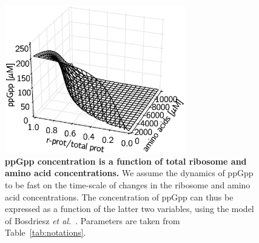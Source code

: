 \documentclass[a4paper,12pt]{article}
\begin{document}



\pagebreak
\begin{figure}[!ht]
\centering
\includegraphics[width=0.7\textwidth]{./Fig/FigS4-1.eps}
\caption[ppGpp concentration is a function of total ribosome and amino acid concentrations.]
{
{\bf ppGpp concentration is a function of total ribosome and amino acid concentrations.}\newline
We assume the dynamics of ppGpp to be fast on the time-scale of changes in the ribosome and amino acid concentrations.
The concentration of ppGpp can thus be expressed as a function of the latter two variables, using the model of Bosdriesz \textit{et al.}~\cite{bosdriesz_how_2015}.
Parameters are taken from Table~\ref{tab:notations}.
}
\label{fig:ppGpp}
\end{figure}

\pagebreak
\end{document}
